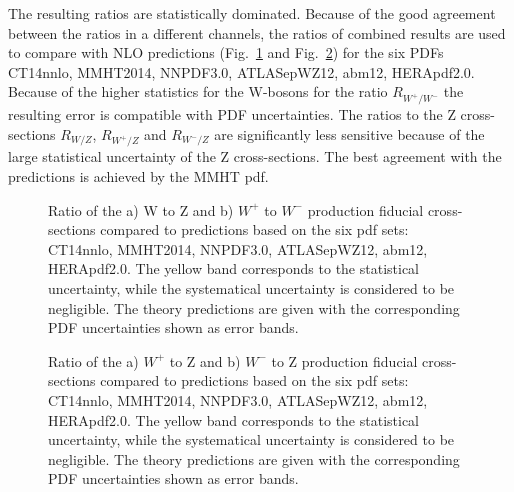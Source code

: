 The resulting ratios are statistically dominated. Because of the good agreement between the ratios in a different channels, the ratios of combined results are used to compare with NLO predictions (Fig.~\ref{fig:WRatio} and Fig.~\ref{fig:ZRatio}) for the six PDFs CT14nnlo, MMHT2014, NNPDF3.0, ATLASepWZ12, abm12, HERApdf2.0. Because of the higher statistics for the W-bosons for the ratio $R_{W^{+}/W^{-}}$ the resulting error is compatible with PDF uncertainties. The ratios to the Z cross-sections $R_{W/Z}$, $R_{W^{+}/Z}$ and $R_{W^{-}/Z}$ are significantly less sensitive because of the large statistical uncertainty of the Z cross-sections. The best agreement with the predictions is achieved by the MMHT pdf.

\begin{figure}[!tbp]
\begin{minipage}[h]{0.49\linewidth}
\end{minipage}
\hfill
\begin{minipage}[h]{0.49\linewidth}
\end{minipage}
\caption{Ratio of the a) W to Z  and b) $W^+$ to $W^-$ production fiducial cross-sections compared to predictions based on the six pdf sets:  CT14nnlo, MMHT2014, NNPDF3.0, ATLASepWZ12, abm12, HERApdf2.0. The yellow band corresponds to the statistical uncertainty, while the systematical uncertainty is considered to be negligible. The theory predictions are given with the corresponding PDF uncertainties shown as error bands.}
\label{fig:WRatio}
\end{figure}

\begin{figure}[!tbp]
\begin{minipage}[h]{0.49\linewidth}
\end{minipage}
\hfill
\begin{minipage}[h]{0.49\linewidth}
\end{minipage}
\caption{Ratio of the a) $W^+$  to Z  and b) $W^-$ to Z production fiducial cross-sections compared to predictions based on the six pdf sets:  CT14nnlo, MMHT2014, NNPDF3.0, ATLASepWZ12, abm12, HERApdf2.0. The yellow band corresponds to the statistical uncertainty, while the systematical uncertainty is considered to be negligible. The theory predictions are given with the corresponding PDF uncertainties shown as error bands.}
\label{fig:ZRatio}
\end{figure}

